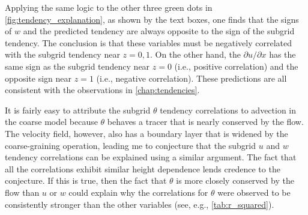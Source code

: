 \documentclass[../main.tex]{subfiles}
\begin{document}
Applying the same logic to the other three green dots in
\cref{fig:tendency_explanation}, as shown by the text boxes, one finds that the
signs of $w$ and the predicted tendency are always opposite to the sign of the
subgrid tendency. The conclusion is that these variables must be negatively
correlated with the subgrid tendency near $z=0,1$. On the other hand, the
$\partial u/\partial x$ has the same sign as the subgrid tendency near $z=0$
(i.e., positive correlation) and the opposite sign near $z=1$ (i.e., negative
correlation). These predictions are all consistent with the observations in
\cref{chap:tendencies}.

It is fairly easy to attribute the subgrid $\theta$ tendency correlations to
advection in the coarse model because $\theta$ behaves a tracer that is nearly
conserved by the flow. The velocity field, however, also has a boundary layer
that is widened by the coarse-graining operation, leading me to conjecture that
the subgrid $u$ and $w$ tendency correlations can be explained using a similar
argument. The fact that all the correlations exhibit similar height dependence
lends credence to the conjecture. If this is true, then the fact that $\theta$
is more closely conserved by the flow than $u$ or $w$ could explain why the
correlations for $\theta$ were observed to be consistently stronger than the
other variables (see, e.g., \cref{tab:r_squared}).
\end{document}
